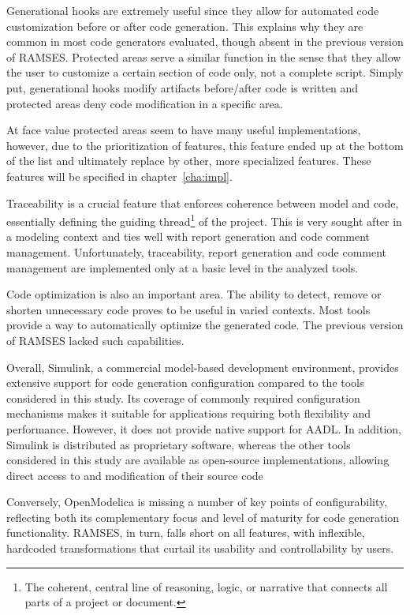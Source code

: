 Generational hooks\footnotemark[6]{} are extremely useful since they allow for automated code customization before or after code generation. This explains why they are common in most code generators evaluated, though absent in the previous version of \gls{RAMSES}. Protected areas serve a similar function in the sense that they allow the user to customize a certain section of code only, not a complete script. Simply put, generational hooks modify artifacts before/after code is written and protected areas deny code modification in a specific area. 

At face value protected areas seem to have many useful implementations, however, due to the prioritization of features, this feature ended up at the bottom of the list and ultimately replace by other, more specialized features. These features will be specified in chapter~\ref{cha:impl}.

Traceability is a crucial feature that enforces coherence between model and code, essentially defining the guiding thread\footnote{The coherent, central line of reasoning, logic, or narrative that connects all parts of a project or document.} of the project. This is very sought after in a modeling context and ties well with report generation and code comment management. Unfortunately, traceability, report generation and code comment management are implemented only at a basic level in the analyzed tools.

Code optimization is also an important area. The ability to detect, remove or shorten  unnecessary code proves to be useful in varied contexts. Most tools provide a way to automatically optimize the generated code. The previous version of \gls{RAMSES} lacked such capabilities.

Overall, Simulink, a commercial model-based development environment, provides extensive support for code generation configuration compared to the tools considered in this study. Its coverage of commonly required configuration mechanisms makes it suitable for applications requiring both flexibility and performance. However, it does not provide native support for \gls{AADL}. In addition, Simulink is distributed as proprietary software, whereas the other tools considered in this study are available as open-source implementations, allowing direct access to and modification of their source code

Conversely, OpenModelica is missing a number of key points of configurability, reflecting both its complementary focus and level of maturity for code generation functionality. \gls{RAMSES}, in turn, falls short on all features, with inflexible, hardcoded transformations that curtail its usability and controllability by users.

